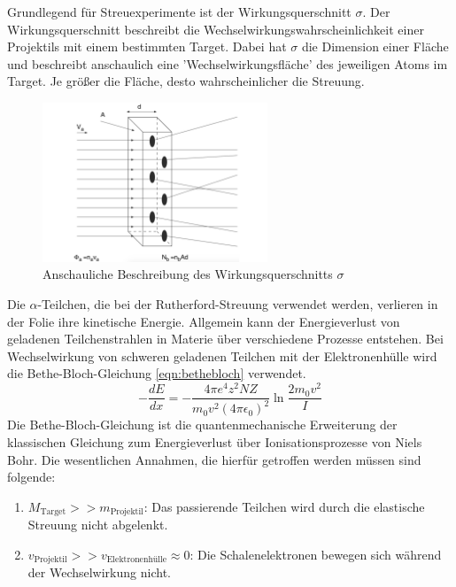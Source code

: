 Grundlegend für Streuexperimente ist der Wirkungsquerschnitt $\sigma$.
Der Wirkungsquerschnitt beschreibt die Wechselwirkungswahrscheinlichkeit einer Projektils mit einem bestimmten Target.
Dabei hat $\sigma$ die Dimension einer Fläche und beschreibt anschaulich eine 'Wechselwirkungsfläche' des jeweiligen Atoms im Target.
Je größer die Fläche, desto wahrscheinlicher die Streuung.
\begin{figure}[h!]
  \centering
  \includegraphics[width=0.6\textwidth]{images/wq.pdf}
  \caption{Anschauliche Beschreibung des Wirkungsquerschnitts $\sigma$ \cite{povh}}
  \label{fig:wq}
\end{figure}

Die $\alpha$-Teilchen, die bei der Rutherford-Streuung verwendet werden, verlieren in der Folie ihre kinetische Energie.
Allgemein kann der Energieverlust von geladenen Teilchenstrahlen in Materie über verschiedene Prozesse entstehen.
Bei Wechselwirkung von schweren geladenen Teilchen mit der Elektronenhülle wird die Bethe-Bloch-Gleichung \eqref{eqn:bethebloch} verwendet.
\begin{equation}
	- \frac{d E}{d x} = - \frac{4 \pi e^4 z^2 N Z}{m_0 v^2 (4 \pi \epsilon_0)^2} \ln{\frac{2 m_0 v^2}{I}}
\end{equation}
Die Bethe-Bloch-Gleichung ist die quantenmechanische Erweiterung der klassischen Gleichung zum Energieverlust über Ionisationsprozesse von Niels Bohr.
Die wesentlichen Annahmen, die hierfür getroffen werden müssen sind folgende:
\begin{enumerate}
	\item $M_{\text{Target}} >> m_{\text{Projektil}}$: Das passierende Teilchen wird durch die elastische Streuung nicht abgelenkt.
	\item $v_{\text{Projektil}} >> v_{\text{Elektronenhülle}} \approx 0$: Die Schalenelektronen bewegen sich während der Wechselwirkung nicht.
\end{enumerate}

%
%
